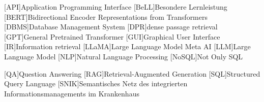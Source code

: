 \begin{acronym}[SPARQL]
[API]{Application Programming Interface}
[BeLL]{Besondere Lernleistung}
[BERT]{Bidirectional Encoder Representations from Transformers}
[DBMS]{Database Management System}
[DPR]{dense passage retrieval}
[GPT]{General Pretrained Transformer}
[GUI]{Graphical User Interface}
[IR]{Information retrieval}
[LLaMA]{Large Language Model Meta AI}
[LLM]{Large Language Model}
[NLP]{Natural Language Processing}
[NoSQL]{Not Only SQL}

[QA]{Question Answering}
[RAG]{Retrieval-Augmented Generation}
[SQL]{Structured Query Language}
[SNIK]{Semantisches Netz des integrierten Informationsmanagements im Krankenhaus}
\end{acronym}
